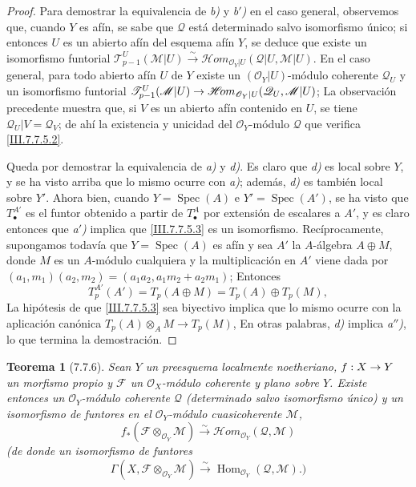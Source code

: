 \documentclass[10pt,oneside,openany]{book}
\theoremstyle{egaenv}\newtheorem*{env}{---}
\theoremstyle{egastatement}
\newtheorem*{theorem}{Teorema}
\theoremstyle{egadescription}
\newcommand{\oldpage}[2][]{\marginnote{\normalfont\scriptsize\textbf{#1}\,|\,#2}\ignorespaces}
\renewcommand{\to}{\mathchoice{\longrightarrow}{\rightarrow}{\rightarrow}{\rightarrow}}
\begin{document}
\begin{proof}
Para demostrar la equivalencia de \emph{b)} y \emph{b$'$)} en el caso general, observemos que,
cuando $Y$ es afín, se sabe que $\mathscr Q$ está determinado salvo isomorfismo
único; si entonces $U$ es un abierto afín del esquema afín $Y$, se deduce que
existe un isomorfismo funtorial
$\mathscr T_{p-1}^{U}(\mathscr M|U)\xrightarrow{\sim}\mathscr{H}\!om_{\mathscr O_Y|U}(\mathscr Q|U,\mathscr M|U)$.
En el caso general, para todo abierto afín $U$ de $Y$ existe un
$(\mathscr O_Y|U)$-módulo coherente $\mathscr Q_U$ y un isomorfismo funtorial
$\mathscr T_{p-1}^{U}(\mathscr M|U)\to\mathscr{H}\!om_{\mathscr O_Y|U}(\mathscr Q_U,\mathscr M|U)$;
La observación precedente muestra que, si $V$ es un abierto afín contenido en
$U$, se tiene $\mathscr Q_U|V=\mathscr Q_V$; de ahí la existencia y unicidad
del $\mathscr O_Y$-módulo $\mathscr Q$ que verifica \eqref{III.7.7.5.2}.

Queda por demostrar la equivalencia de \emph{a)} y \emph{d)}. Es claro que \emph{d)} es local sobre
$Y$, y se ha visto arriba que lo mismo ocurre con \emph{a)}; además, \emph{d)} es también local
sobre $Y'$. Ahora bien, cuando $Y=\operatorname{Spec}(A)$ e
$Y'=\operatorname{Spec}(A')$, se ha visto que $T_\bullet^{A'}$ es el funtor obtenido
\oldpage[III]{201}
a partir de $T_\bullet^A$ por extensión de escalares a $A'$, y es claro entonces
que \emph{a$'$)} implica que \eqref{III.7.7.5.3} es un isomorfismo.
Recíprocamente, supongamos todavía que $Y=\operatorname{Spec}(A)$ es afín y sea
$A'$ la $A$-álgebra $A\oplus M$, donde $M$ es un $A$-módulo cualquiera y la
multiplicación en $A'$ viene dada por
$(a_1,m_1)(a_2,m_2)=(a_1a_2,a_1m_2+a_2m_1)$;
Entonces
\[
  T_p^{A'}(A')
  =
  T_p(A\oplus M)
  =
  T_p(A)\oplus T_p(M),
\]
La hipótesis de que \eqref{III.7.7.5.3} sea biyectivo implica que lo mismo
ocurre con la aplicación canónica
$T_p(A)\otimes_A M\longrightarrow T_p(M)$,
En otras palabras, \emph{d)} implica \emph{a$''$)}, lo que termina la demostración.
\end{proof}

\begin{theorem}[7.7.6]
\label{III.7.7.6}
Sean $Y$ un preesquema localmente noetheriano, $f:X\to Y$ un morfismo propio y
$\mathscr F$ un $\mathscr O_X$-módulo coherente y plano sobre $Y$. Existe
entonces un $\mathscr O_Y$-módulo coherente $\mathscr Q$ (determinado salvo
isomorfismo único) y un isomorfismo de funtores en el
$\mathscr O_Y$-módulo cuasicoherente $\mathscr M$,
\[
  f_*(\mathscr F\otimes_{\mathscr O_Y}\mathscr M)
  \xrightarrow{\sim}
  \mathscr{H}\!om_{\mathscr O_Y}(\mathscr Q,\mathscr M)
  \tag{7.7.6.1}\label{III.7.7.6.1.fr}
\]
\textup{(de donde un isomorfismo de funtores}
\[
  \Gamma(X,\mathscr F\otimes_{\mathscr O_Y}\mathscr M)
  \xrightarrow{\sim}
  \operatorname{Hom}_{\mathscr O_Y}(\mathscr Q,\mathscr M).)
  \tag{7.7.6.2}\label{III.7.7.6.2.fr}
\]
\end{theorem}
\end{document}
